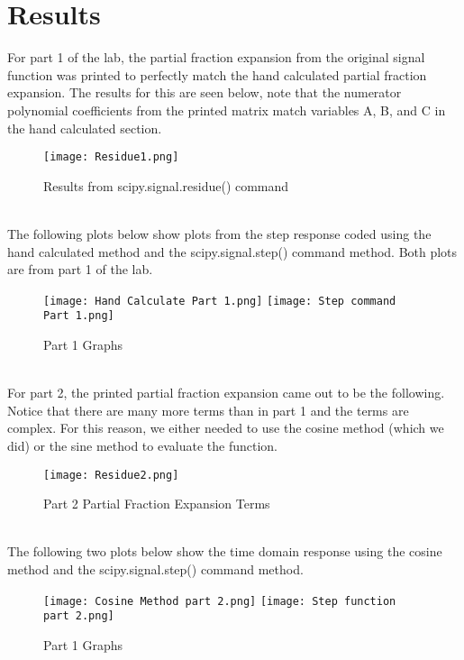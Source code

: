 \documentclass[12pt]{report}
\begin{document}
\section{Results}
\hspace{\parindent}For part 1 of the lab, the partial fraction expansion from the original signal function was printed to perfectly match the hand calculated partial fraction expansion. The results for this are seen below, note that the numerator polynomial coefficients from the printed matrix match variables A, B, and C in the hand calculated section.
\begin{figure}[h!]
    \centering
    \texttt{[image: Residue1.png]}
    \caption{Results from scipy.signal.residue() command}
    \label{Figure x:}
\end{figure}
\\
\hspace{\parindent}The following plots below show plots from the step response coded using the hand calculated method and the scipy.signal.step() command method. Both plots are from part 1 of the lab.
\begin{figure}[h!]
    \centering
    \texttt{[image: Hand Calculate Part 1.png]}
    \texttt{[image: Step command Part 1.png]}
    \caption{Part 1 Graphs}
    \label{Figure x:}
\end{figure}
\\
\hspace{\parindent}For part 2, the printed partial fraction expansion came out to be the following. Notice that there are many more terms than in part 1 and the terms are complex. For this reason, we either needed to use the cosine method (which we did) or the sine method to evaluate the function.
\begin{figure}[h!]
    \centering
    \texttt{[image: Residue2.png]}
    \caption{Part 2 Partial Fraction Expansion Terms}
    \label{Figure x:}
\end{figure}
\\
\hspace{\parindent}The following two plots below show the time domain response using the cosine method and the scipy.signal.step() command method.
\begin{figure}[h!]
    \centering
    \texttt{[image: Cosine Method part 2.png]}
    \texttt{[image: Step function part 2.png]}
    \caption{Part 1 Graphs}
    \label{Figure x:}
\end{figure}
\\
\end{document}

